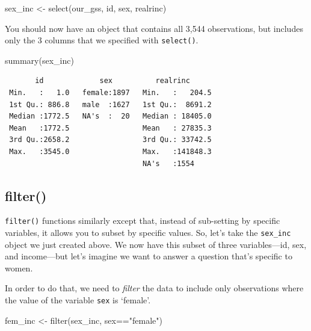 \documentclass[
  letterpaper,
  DIV=11,
  numbers=noendperiod]{scrreprt}
\newenvironment{Shaded}{\begin{snugshade}}{\end{snugshade}}
\newcommand{\FunctionTok}[1]{\textcolor[rgb]{0.28,0.35,0.67}{#1}}
\newcommand{\NormalTok}[1]{\textcolor[rgb]{0.00,0.23,0.31}{#1}}
\newcommand{\OtherTok}[1]{\textcolor[rgb]{0.00,0.23,0.31}{#1}}
\newcommand{\SpecialCharTok}[1]{\textcolor[rgb]{0.37,0.37,0.37}{#1}}
\newcommand{\StringTok}[1]{\textcolor[rgb]{0.13,0.47,0.30}{#1}}
\begin{document}
\begin{Shaded}
\begin{Highlighting}[]
\NormalTok{sex\_inc }\OtherTok{\textless{}{-}} \FunctionTok{select}\NormalTok{(our\_gss, id, sex, realrinc)}
\end{Highlighting}
\end{Shaded}

You should now have an object that contains all 3,544 observations, but
includes only the 3 columns that we specified with \texttt{select()}.

\begin{Shaded}
\begin{Highlighting}[]
\FunctionTok{summary}\NormalTok{(sex\_inc)}
\end{Highlighting}
\end{Shaded}

\begin{verbatim}
       id             sex          realrinc       
 Min.   :   1.0   female:1897   Min.   :   204.5  
 1st Qu.: 886.8   male  :1627   1st Qu.:  8691.2  
 Median :1772.5   NA's  :  20   Median : 18405.0  
 Mean   :1772.5                 Mean   : 27835.3  
 3rd Qu.:2658.2                 3rd Qu.: 33742.5  
 Max.   :3545.0                 Max.   :141848.3  
                                NA's   :1554      
\end{verbatim}

\subsection{filter()}\label{filter}

\texttt{filter()} functions similarly except that, instead of
sub-setting by specific variables, it allows you to subset by specific
values. So, let's take the \texttt{sex\_inc} object we just created
above. We now have this subset of three variables---id, sex, and
income---but let's imagine we want to answer a question that's specific
to women.

In order to do that, we need to \emph{filter} the data to include only
observations where the value of the variable \texttt{sex} is `female'.

\begin{Shaded}
\begin{Highlighting}[]
\NormalTok{fem\_inc }\OtherTok{\textless{}{-}} \FunctionTok{filter}\NormalTok{(sex\_inc, sex}\SpecialCharTok{==}\StringTok{"female"}\NormalTok{)}
\end{Highlighting}
\end{Shaded}
\end{document}

